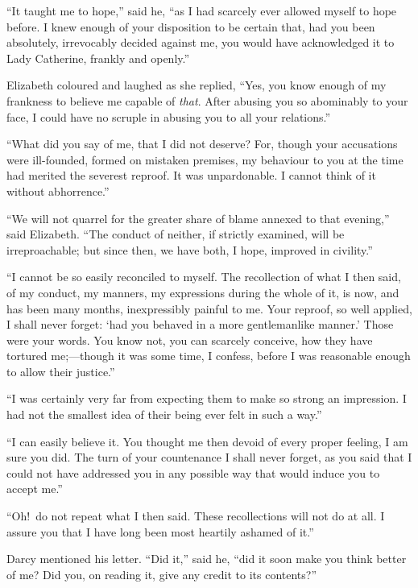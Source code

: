 \documentclass[12pt,english]{book}
\begin{document}
{}``It taught me to hope,'' said he, {}``as I had scarcely ever
allowed myself to hope before. I knew enough of your disposition to
be certain that, had you been absolutely, irrevocably decided against
me, you would have acknowledged it to Lady Catherine, frankly and
openly.''

Elizabeth coloured and laughed as she replied, {}``Yes, you know
enough of my frankness to believe me capable of \textit{that}. After
abusing you so abominably to your face, I could have no scruple in
abusing you to all your relations.''

{}``What did you say of me, that I did not deserve? For, though your
accusations were ill-founded, formed on mistaken premises, my behaviour
to you at the time had merited the severest reproof. It was unpardonable.
I cannot think of it without abhorrence.''

{}``We will not quarrel for the greater share of blame annexed to
that evening,'' said Elizabeth. {}``The conduct of neither, if strictly
examined, will be irreproachable; but since then, we have both, I
hope, improved in civility.''

{}``I cannot be so easily reconciled to myself. The recollection
of what I then said, of my conduct, my manners, my expressions during
the whole of it, is now, and has been many months, inexpressibly painful
to me. Your reproof, so well applied, I shall never forget: `had you
behaved in a more gentlemanlike manner.' Those were your words. You
know not, you can scarcely conceive, how they have tortured me;\mbox{---}though
it was some time, I confess, before I was reasonable enough to allow
their justice.''

{}``I was certainly very far from expecting them to make so strong
an impression. I had not the smallest idea of their being ever felt
in such a way.''

{}``I can easily believe it. You thought me then devoid of every
proper feeling, I am sure you did. The turn of your countenance I
shall never forget, as you said that I could not have addressed you
in any possible way that would induce you to accept me.''

{}``Oh!\ do not repeat what I then said. These recollections will
not do at all. I assure you that I have long been most heartily ashamed
of it.''

Darcy mentioned his letter. {}``Did it,'' said he, {}``did it soon
make you think better of me? Did you, on reading it, give any credit
to its contents?''\ 
\end{document}

